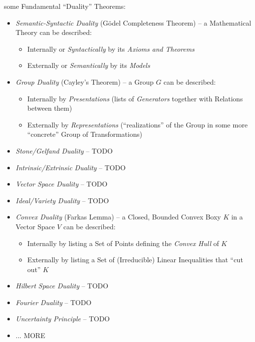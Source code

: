 some Fundamental ``Duality'' Theorems:
\begin{itemize}
  \item \emph{Semantic-Syntactic Duality} (G\"odel Completeness Theorem) --
    a Mathematical Theory can be described:
    \begin{itemize}
      \item Internally or \emph{Syntactically} by its \emph{Axioms and Theorems}
      \item Externally or \emph{Semantically} by its \emph{Models}
    \end{itemize}
  \item \emph{Group Duality} (Cayley's Theorem) -- a Group $G$ can be
    described:
    \begin{itemize}
      \item Internally by \emph{Presentations} (lists of \emph{Generators}
        together with Relations between them)
      \item Externally by \emph{Representations} (``realizations'' of the Group
        in some more ``concrete'' Group of Transformations)
    \end{itemize}

  \item \emph{Stone/Gelfand Duality} -- TODO

  \item \emph{Intrinsic/Extrinsic Duality} -- TODO

  \item \emph{Vector Space Duality} -- TODO

  \item \emph{Ideal/Variety Duality} -- TODO

  \item \emph{Convex Duality} (Farkas Lemma) -- a Closed, Bounded Convex Boxy
    $K$ in a Vector Space $V$ can be described:
    \begin{itemize}
      \item Internally by listing a Set of Points defining the \emph{Convex
        Hull} of $K$
      \item Externally by listing a Set of (Irreducible) Linear Inequalities
        that ``cut out'' $K$
    \end{itemize}

  \item \emph{Hilbert Space Duality} -- TODO

  \item \emph{Fourier Duality} -- TODO

  \item \emph{Uncertainty Principle} -- TODO

  \item ... MORE
\end{itemize}

